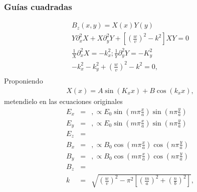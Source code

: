 \subsubsection{Guías cuadradas}
\begin{eqnarray}
	B_{z}(x,y)=X(x)Y(y) \nonumber \\
	Y \partial_{x}^2 X+X \partial_{y}^2Y + [(\frac{w}{v})^2-k^2]XY=0 \nonumber \\
	\frac{1}{X} \partial_{x}^2 X=-k_{x}^2 ; \frac{1}{Y}\partial_{y}^2 Y = -K_{y}^2 \nonumber \\
	-k_{x}^2 - k_{y}^2+(\frac{w}{v})^2 - k^2 = 0 \nonumber,\\
		\end{eqnarray}
	Proponiendo  
		\begin{eqnarray}
	X(x)=A \sin (K_{x} x) + B \cos(k_{x}x)  , 
\end{eqnarray}
	metendielo en las ecuaciones originales
	\begin{eqnarray}
	E_{x}&=&, \propto E_{0} \sin(m \pi \frac{x}{a}) \sin(n \pi \frac{y}{a})\\
	E_{y}&=&, \propto E_{0} \sin(m \pi \frac{x}{a}) \sin(n \pi \frac{y}{a})\\
	E_{z}&=& \\
	B_{x}&=& , \propto B_{0} \cos(m \pi \frac{x}{a}) \cos(n \pi \frac{y}{a}) \\
	B_{y}&=& , \propto B_{0} \cos(m \pi \frac{x}{a}) \cos(n \pi \frac{y}{a}) \\
	B_{z}&=&  \\
	k &=& \sqrt{(\frac{w}{v})^2-\pi^2 [(\frac{m}{a})^2+(\frac{n}{b})^2]}, 
\end{eqnarray}
